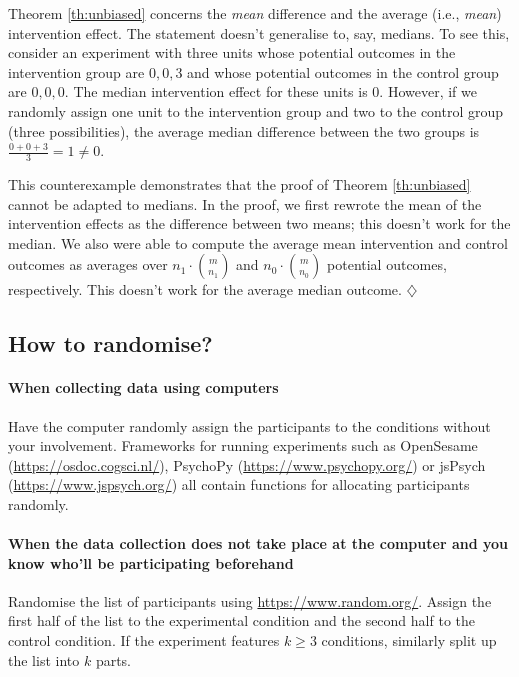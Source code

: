 \documentclass[a4paper]{tufte-book}\usepackage[]{graphicx}\usepackage[]{xcolor}
\newcommand*{\parend}[1][$\diamondsuit$]{%
  \unskip\nobreak\hspace{1em plus 1fill}$\diamondsuit$%
}
\begin{document}
  Theorem \ref{th:unbiased} concerns the \emph{mean} difference and 
  the average (i.e., \emph{mean}) intervention effect.
  The statement doesn't generalise to, say, medians.
  To see this, consider an experiment with three units
  whose potential outcomes in the intervention group are $0, 0, 3$
  and whose potential outcomes in the control group are $0, 0, 0$.
  The median intervention effect for these units is 0.
  However, if we randomly assign one unit to the intervention group
  and two to the control group (three possibilities),
  the average median difference between the two groups is
  $\frac{0 + 0 + 3}{3} = 1 \neq 0$.
  
  This counterexample demonstrates that the proof of Theorem \ref{th:unbiased} 
  cannot be adapted to medians.
  In the proof, we first rewrote the mean of the intervention effects
  as the difference between two means; this doesn't work for the median.
  We also were able to compute the average mean intervention and control outcomes
  as averages over $n_1 \cdot \binom{m}{n_1}$ and $n_0 \cdot \binom{m}{n_0}$
  potential outcomes, respectively.
  This doesn't work for the average median outcome.
\parend

\subsection{How to randomise?}

\paragraph{When collecting data using computers}
Have the computer randomly assign the
participants to the conditions
without your involvement. 
Frameworks for running experiments such as OpenSesame 
(\url{https://osdoc.cogsci.nl/}),
PsychoPy (\url{https://www.psychopy.org/})
or jsPsych (\url{https://www.jspsych.org/}) 
all contain functions for allocating participants randomly.

\paragraph{When the data collection does not take place
at the computer and you know who'll be participating
beforehand}
Randomise the list of participants using \url{https://www.random.org/}.
Assign the first half of the list to the experimental condition
and the second half to the control condition.
If the experiment features $k \geq 3$ conditions,
similarly split up the list into $k$ parts.
\end{document}
